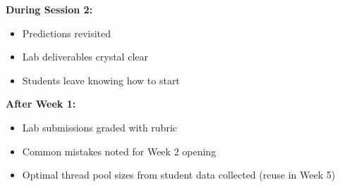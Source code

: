 \documentclass[11pt,a4paper]{article}
\begin{document}
\textbf{During Session 2:}
\begin{itemize}[leftmargin=*]
\item[$\square$] Predictions revisited
\item[$\square$] Lab deliverables crystal clear
\item[$\square$] Students leave knowing how to start
\end{itemize}

\textbf{After Week 1:}
\begin{itemize}[leftmargin=*]
\item[$\square$] Lab submissions graded with rubric
\item[$\square$] Common mistakes noted for Week 2 opening
\item[$\square$] Optimal thread pool sizes from student data collected (reuse in Week 5)
\end{itemize}
	
	
\end{document}
